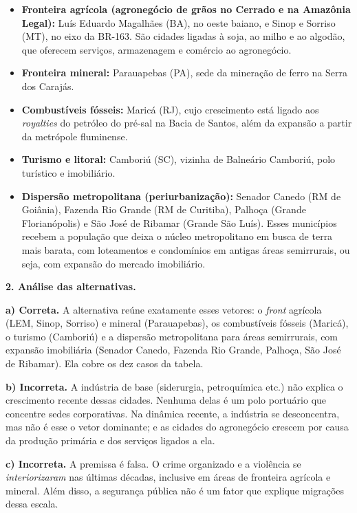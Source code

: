 \documentclass{article}%
\begin{document}
\begin{itemize}
\item \textbf{Fronteira agrícola (agronegócio de grãos no Cerrado e na Amazônia Legal):} Luís Eduardo Magalhães (BA), no oeste baiano, e Sinop e Sorriso (MT), no eixo da BR-163. São cidades ligadas à soja, ao milho e ao algodão, que oferecem serviços, armazenagem e comércio ao agronegócio.
\item \textbf{Fronteira mineral:} Parauapebas (PA), sede da mineração de ferro na Serra dos Carajás.
\item \textbf{Combustíveis fósseis:} Maricá (RJ), cujo crescimento está ligado aos \emph{royalties} do petróleo do pré-sal na Bacia de Santos, além da expansão a partir da metrópole fluminense.
\item \textbf{Turismo e litoral:} Camboriú (SC), vizinha de Balneário Camboriú, polo turístico e imobiliário.
\item \textbf{Dispersão metropolitana (periurbanização):} Senador Canedo (RM de Goiânia), Fazenda Rio Grande (RM de Curitiba), Palhoça (Grande Florianópolis) e São José de Ribamar (Grande São Luís). Esses municípios recebem a população que deixa o núcleo metropolitano em busca de terra mais barata, com loteamentos e condomínios em antigas áreas semirrurais, ou seja, com expansão do mercado imobiliário.
\end{itemize}

\textbf{2. Análise das alternativas.}

\textbf{a) Correta.} A alternativa reúne exatamente esses vetores: o \emph{front} agrícola (LEM, Sinop, Sorriso) e mineral (Parauapebas), os combustíveis fósseis (Maricá), o turismo (Camboriú) e a dispersão metropolitana para áreas semirrurais, com expansão imobiliária (Senador Canedo, Fazenda Rio Grande, Palhoça, São José de Ribamar). Ela cobre os dez casos da tabela.

\textbf{b) Incorreta.} A indústria de base (siderurgia, petroquímica etc.) não explica o crescimento recente dessas cidades. Nenhuma delas é um polo portuário que concentre sedes corporativas. Na dinâmica recente, a indústria se desconcentra, mas não é esse o vetor dominante; e as cidades do agronegócio crescem por causa da produção primária e dos serviços ligados a ela.

\textbf{c) Incorreta.} A premissa é falsa. O crime organizado e a violência se \emph{interiorizaram} nas últimas décadas, inclusive em áreas de fronteira agrícola e mineral. Além disso, a segurança pública não é um fator que explique migrações dessa escala.
\end{document}

